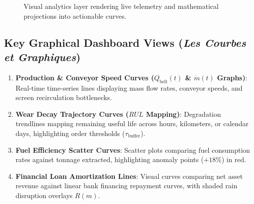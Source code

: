 \documentclass[11pt, a4paper]{article}
\begin{document}
\begin{figure}[htbp]
  \centering
  \caption{Visual analytics layer rendering live telemetry and mathematical projections into actionable curves.}
  \label{fig:dashboard_vis}
\end{figure}

\subsection{Key Graphical Dashboard Views (\textit{Les Courbes et Graphiques})}
\begin{enumerate}
    \item \textbf{Production \& Conveyor Speed Curves ($Q_{\text{belt}}(t)$ \& $\dot{m}(t)$ Graphs)}: Real-time time-series lines displaying mass flow rates, conveyor speeds, and screen recirculation bottlenecks.
    \item \textbf{Wear Decay Trajectory Curves ($RUL$ Mapping)}: Degradation trendlines mapping remaining useful life across hours, kilometers, or calendar days, highlighting order thresholds ($\tau_{\text{buffer}}$).
    \item \textbf{Fuel Efficiency Scatter Curves}: Scatter plots comparing fuel consumption rates against tonnage extracted, highlighting anomaly points ($+18\%$) in red.
    \item \textbf{Financial Loan Amortization Lines}: Visual curves comparing net asset revenue against linear bank financing repayment curves, with shaded rain disruption overlays $R(m)$.
\end{enumerate}
\end{document}
